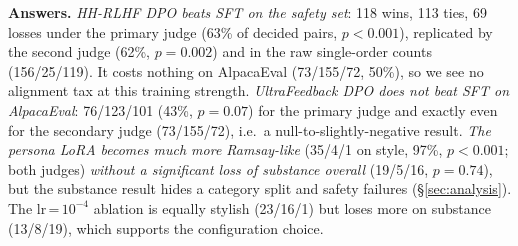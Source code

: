 \documentclass[10pt]{article}
\begin{document}
\begin{table}[H]\centering\small
\caption{DPO (or LoRA-DPO) vs.\ its baseline. W/T/L = wins/ties/losses of the candidate. ``Raw'' = primary judge, original order only. Win\% = W/(W+L) (ties excluded) / (W+T/2)/(W+T+L) (ties counted as half); $p$ = two-sided exact sign test on W vs.\ L. Agree/$\kappa$ = raw agreement and Cohen's $\kappa$ between the two judges' swap-consistent outcomes. Rows 1--2 are the required comparisons; rows 3--4 are cross-set checks (alignment tax); persona rows compare against SmolLM2-360M-Instruct without the adapter.}
\label{tab:results}
\end{table}

\textbf{Answers.} \emph{HH-RLHF DPO beats SFT on the safety set}: 118 wins, 113 ties, 69 losses under the primary judge (63\% of decided pairs, $p<0.001$), replicated by the second judge (62\%, $p=0.002$) and in the raw single-order counts (156/25/119). It costs nothing on AlpacaEval (73/155/72, 50\%), so we see no alignment tax at this training strength. \emph{UltraFeedback DPO does not beat SFT on AlpacaEval}: 76/123/101 (43\%, $p=0.07$) for the primary judge and exactly even for the secondary judge (73/155/72), i.e.\ a null-to-slightly-negative result. \emph{The persona LoRA becomes much more Ramsay-like} (35/4/1 on style, 97\%, $p<0.001$; both judges) \emph{without a significant loss of substance overall} (19/5/16, $p=0.74$), but the substance result hides a category split and safety failures (\S\ref{sec:analysis}). The lr\,=\,$10^{-4}$ ablation is equally stylish (23/16/1) but loses more on substance (13/8/19), which supports the configuration choice.
\end{document}

